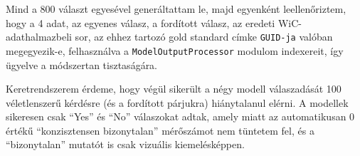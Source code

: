 \documentclass[12pt]{report}
\begin{document}
    Mind a 800 választ egyesével generáltattam le, majd egyenként leellenőriztem, hogy a 4 adat, az egyenes válasz, a fordított válasz, az eredeti WiC-adathalmazbeli sor, az ehhez tartozó gold standard címke \texttt{GUID-ja} valóban megegyezik-e, felhasználva a \texttt{\allowbreak ModelOutputProcessor} modulom indexereit, így ügyelve a módszertan tisztaságára.

    Keretrendszerem érdeme, hogy végül sikerült a négy modell válaszadását 100 véletlenszerű kérdésre (és a fordított párjukra) hiánytalanul elérni.
    A modellek sikeresen csak ``Yes'' és ``No'' válaszokat adtak, amely miatt az automatikusan 0 értékű ``konzisztensen bizonytalan'' mérőszámot nem tüntetem fel, és a ``bizonytalan'' mutatót is csak vizuális kiemelésképpen.

\end{document}
